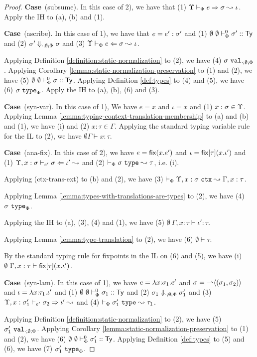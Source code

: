 \documentclass[12pt]{article}
\newcommand{\pfcase}[1]{\textbf{Case}~#1. }
\begin{document}
\begin{proof}
\pfcase{(subsume)} In this case of 2), we have that (1) $\esynX{e}{\st}{\iota}$. Apply the IH to (a), (b) and (1).

\pfcase{(ascribe)} In this case of 1), we have that $e=e' : \st'$ and (1) $\sofkVXz{\st'}{\kty}$ and (2) $\st' \Downarrow_{\cdot;\emptyset;\Phi} \st$ and (3) $\eanaX{e}{\st}{\iota}$.

Applying Definition \ref{definition:static-normalization} to (2), we have (4) $\sval{\st}{\cdot;\emptyset;\Phi}$. Applying Corollary \ref{lemma:static-normalization-preservation} to (1) and (2), we have (5) $\sofkVXz{\st}{\kty}$. Applying Definition \ref{def:types} to (4) and (5), we have (6) $\istype{\st}{\Phi}$. Apply the IH to (a), (b), (6) and (3).

\pfcase{(syn-var)} In this case of 1), We have $e=x$ and $\iota=x$ and (1) $x : \st \in \Upsilon$. Applying Lemma \ref{lemma:typing-context-translation-membership} to (a) and (b) and (1), we have (i) and (2) $x : \tau \in \Gamma$. Applying the standard typing variable rule for the IL to (2), we have $\emptyset \Gamma \vdash x : \tau$.

\pfcase{(ana-fix)} In this case of 2), we have $e=\efix{x}{e'}$ and $\iota=\ifix{\tau}{x}{\iota'}$ and (1) $\eana{\Upsilon, x : \st}{e'}{\st}{\iota'}$ and (2) $\tytransX{\st}{\tau}$, i.e. (i). 

Applying (ctx-trans-ext) to (b) and (2), we have (3) $\ctxtransX{\Upsilon, x : \st}{\Gamma, x : \tau}$. 

Applying Lemma \ref{lemma:types-with-translations-are-types} to (2), we have (4) $\istype{\st}{\Phi}$.

Applying the IH to (a), (3), (4) and (1), we have (5) $\emptyset~\Gamma, x : \tau \vdash \iota' : \tau$.

Applying Lemma \ref{lemma:type-translation} to (2), we have (6) $\emptyset \vdash \tau$.

By the standard typing rule for fixpoints in the IL on (6) and (5), we have (i) $\emptyset~\Gamma, x : \tau \vdash \ifix{\tau}{x}{\iota'}$.

\pfcase{(syn-lam)} In this case of 1), we have $e=\elam{\st_1}{x}{e'}$ and $\st=\sty{\rightharpoonup}{(\st_1, \st_2)}$ and $\iota=\ilam{\tau_1}{x}{\iota'}$ and (1) $\sofkVXz{\st_1}{\kty}$ and (2) $\st_1 \Downarrow_{\cdot;\emptyset;\Phi} \st_1'$ and (3) $\esyn{\Upsilon, x : \st_1'}{e'}{\st_2}{\iota'}$ and (4) $\tytransX{\st_1'}{\tau_1}$.

Applying Definition \ref{definition:static-normalization} to (2), we have (5) $\sval{\st_1'}{\cdot;\emptyset;\Phi}$. Applying Corollary \ref{lemma:static-normalization-preservation} to (1) and (2), we have (6) $\sofkVXz{\st_1'}{\kty}$. Applying Definition \ref{def:types} to (5) and (6), we have (7) $\istype{\st_1'}{\Phi}$.


\end{proof}
\end{document}
